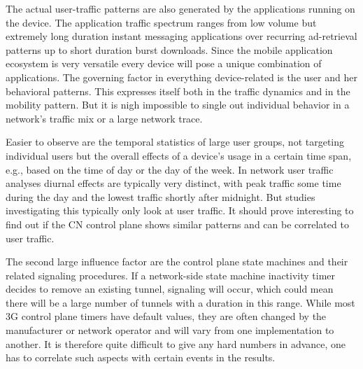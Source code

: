The actual user-traffic patterns are also generated by the applications running on the device. The application traffic spectrum ranges from low volume but extremely long duration instant messaging applications over recurring ad-retrieval patterns up to short duration burst downloads. Since the mobile application ecosystem is very versatile every device will pose a unique combination of applications. The governing factor in everything device-related is the user and her behavioral patterns. This expresses itself both in the traffic dynamics and in the mobility pattern. But it is nigh impossible to single out individual behavior in a network's traffic mix or a large network trace.

Easier to observe are the temporal statistics of large user groups, not targeting individual users but the overall effects of a device's usage in a certain time span, e.g., based on the time of day or the day of the week. In network user traffic analyses diurnal effects are typically very distinct, with peak traffic some time during the day and the lowest traffic shortly after midnight. But studies investigating this typically only look at user traffic. It should prove interesting to find out if the \gls{CN} control plane shows similar patterns and can be correlated to user traffic.

The second large influence factor are the control plane state machines and their related signaling procedures. If a network-side state machine inactivity timer decides to remove an existing tunnel, signaling will occur, which could mean there will be a large number of tunnels with a duration in this range. While most \gls{3G} control plane timers have default values, they are often changed by the manufacturer or network operator and will vary from one implementation to another. It is therefore quite difficult to give any hard numbers in advance, one has to correlate such aspects with certain events in the results.





